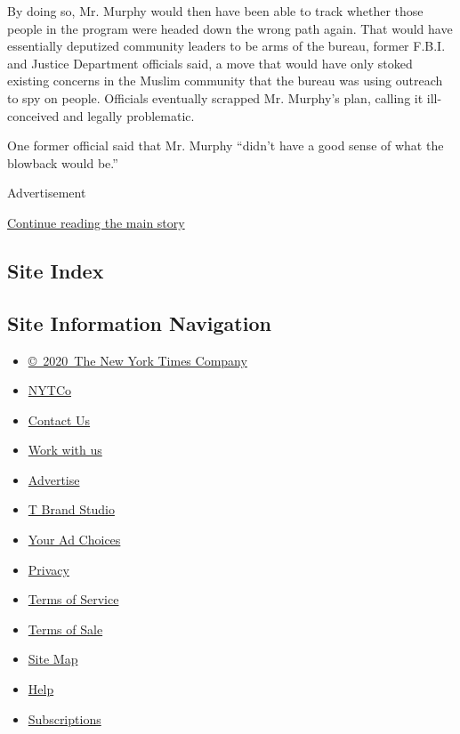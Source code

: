 By doing so, Mr. Murphy would then have been able to track whether those
people in the program were headed down the wrong path again. That would
have essentially deputized community leaders to be arms of the bureau,
former F.B.I. and Justice Department officials said, a move that would
have only stoked existing concerns in the Muslim community that the
bureau was using outreach to spy on people. Officials eventually
scrapped Mr. Murphy's plan, calling it ill-conceived and legally
problematic.

One former official said that Mr. Murphy ``didn't have a good sense of
what the blowback would be.''

Advertisement

\protect\hyperlink{after-bottom}{Continue reading the main story}

\hypertarget{site-index}{%
\subsection{Site Index}\label{site-index}}

\hypertarget{site-information-navigation}{%
\subsection{Site Information
Navigation}\label{site-information-navigation}}

\begin{itemize}
\tightlist
\item
  \href{https://help.nytimes.com/hc/en-us/articles/115014792127-Copyright-notice}{©~2020~The
  New York Times Company}
\end{itemize}

\begin{itemize}
\tightlist
\item
  \href{https://www.nytco.com/}{NYTCo}
\item
  \href{https://help.nytimes.com/hc/en-us/articles/115015385887-Contact-Us}{Contact
  Us}
\item
  \href{https://www.nytco.com/careers/}{Work with us}
\item
  \href{https://nytmediakit.com/}{Advertise}
\item
  \href{http://www.tbrandstudio.com/}{T Brand Studio}
\item
  \href{https://www.nytimes.com/privacy/cookie-policy\#how-do-i-manage-trackers}{Your
  Ad Choices}
\item
  \href{https://www.nytimes.com/privacy}{Privacy}
\item
  \href{https://help.nytimes.com/hc/en-us/articles/115014893428-Terms-of-service}{Terms
  of Service}
\item
  \href{https://help.nytimes.com/hc/en-us/articles/115014893968-Terms-of-sale}{Terms
  of Sale}
\item
  \href{https://spiderbites.nytimes.com}{Site Map}
\item
  \href{https://help.nytimes.com/hc/en-us}{Help}
\item
  \href{https://www.nytimes.com/subscription?campaignId=37WXW}{Subscriptions}
\end{itemize}
